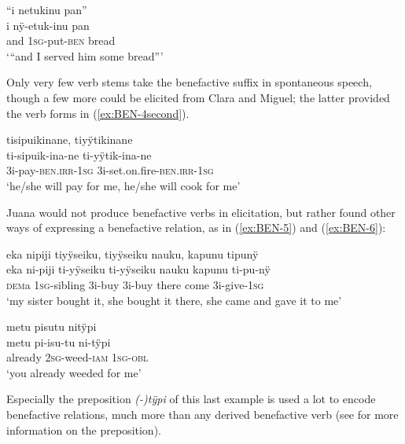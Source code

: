 \ea\label{ex:BEN-3}
\begingl
\glpreamble “i netukinu pan”\\
\gla i nÿ-etuk-inu pan\\
\glb and 1\textsc{sg}-put-\textsc{ben} bread\\
\glft ‘“and I served him some bread”’
\endgl
\trailingcitation{[jxx-e150925l-1.129]}%
\xe
{}

Only very few verb stems take the benefactive suffix in spontaneous speech, though a few more could be elicited from Clara and Miguel; the latter provided the verb forms in (\ref{ex:BEN-4second}).

\ea\label{ex:BEN-4second}
\begingl
\glpreamble tisipuikinane, tiyÿtikinane\\
\gla ti-sipuik-ina-ne ti-yÿtik-ina-ne\\
\glb 3i-pay-\textsc{ben.irr}-1\textsc{sg} 3i-set.on.fire-\textsc{ben.irr}-1\textsc{sg}\\
\glft ‘he/she will pay for me, he/she will cook for me'
\endgl
\trailingcitation{[mxx-e181024l]}
\xe{}

Juana would not produce benefactive verbs in elicitation, but rather found other ways of expressing a benefactive relation, as in (\ref{ex:BEN-5}) and (\ref{ex:BEN-6}):

\ea\label{ex:BEN-5}
\begingl
\glpreamble eka nipiji tiyÿseiku, tiyÿseiku nauku, kapunu tipunÿ\\
\gla eka ni-piji ti-yÿseiku ti-yÿseiku nauku kapunu ti-pu-nÿ\\
\glb \textsc{dem}a 1\textsc{sg}-sibling 3i-buy 3i-buy there come 3i-give-1\textsc{sg}\\
\glft ‘my sister bought it, she bought it there, she came and gave it to me’
\endgl
\trailingcitation{[jxx-e191021e-2]}
\xe

\ea\label{ex:BEN-6}
\begingl
\glpreamble metu pisutu nitÿpi\\
\gla metu pi-isu-tu ni-tÿpi\\
\glb already 2\textsc{sg}-weed-\textsc{iam} 1\textsc{sg}-\textsc{obl}\\
\glft ‘you already weeded for me’
\endgl
\trailingcitation{[jxx-e191021e-2]}
\xe

Especially the  preposition \textit{(-)tÿpi} of this last example is used a lot to encode benefactive relations, much more than any derived benefactive verb (see  for more information on the preposition).


